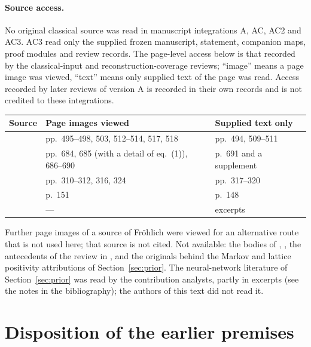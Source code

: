 \documentclass[11pt]{article}
\theoremstyle{plain}
\theoremstyle{definition}
\theoremstyle{remark}
\begin{document}
\paragraph{Source access.} No original classical source was read in manuscript
integrations A, AC, AC2 and AC3. AC3 read only the supplied frozen manuscript,
statement, companion maps, proof modules and review records. The page-level
access below is that recorded by the classical-input and reconstruction-coverage
reviews; ``image'' means a page image was viewed, ``text'' means only supplied
text of the page was read. Access recorded by later reviews of version A is
recorded in their own records and is not credited to these integrations.
\begin{center}
\small
\begin{tabular}{@{}p{}p{}p{}@{}}
\toprule
Source & Page images viewed & Supplied text only\\
\midrule
\cite{FS1977} & pp.~495--498, 503, 512--514, 517, 518 & pp.~494, 509--511\\
\cite{AHKZ1989} & pp.~684, 685 (with a detail of eq.~(1)), 686--690 & p.~691 and a supplement\\
\cite{GRS1976} & pp.~310--312, 316, 324 & pp.~317--320\\
\cite{SG1973} & p.~151 & p.~148\\
\cite{Melrose2016Lecture15} & --- & excerpts\\
\bottomrule
\end{tabular}
\end{center}
Further page images of a source of Fr\"ohlich were viewed for an alternative
route that is not used here; that source is not cited. Not available: the
bodies of \cite{OS1973,OS1975}, \cite{StreaterWightman1964}, the antecedents of the
review in \cite[pp.~316--319]{GRS1976}, and the originals behind the Markov and
lattice positivity attributions of Section~\ref{sec:prior}. The neural-network
literature of Section~\ref{sec:prior} was read by the contribution analysts,
partly in excerpts (see the notes in the bibliography); the authors of this text
did not read it.

\section{Disposition of the earlier premises}\label{app:dispositions}
\end{document}
